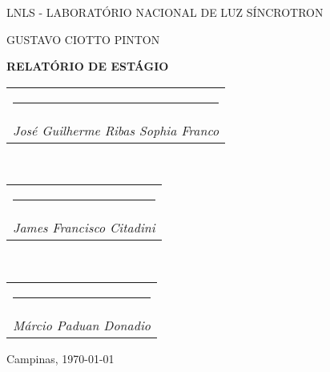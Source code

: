 \newcommand{\namesigdate}[2][8cm]{%
  \begin{tabular}{@{}p{#1}}
    \\[1\normalbaselineskip] \hrule \\[0pt]
    {\small \textit{#2}} \\[1\normalbaselineskip]
  \end{tabular}
}

\begin{center}


\vspace*{12pt}

LNLS - LABORATÓRIO NACIONAL DE LUZ SÍNCROTRON

\vspace*{.25\textheight}

{\Large GUSTAVO CIOTTO PINTON}

\vspace*{72pt}
\textbf{\Large RELATÓRIO DE ESTÁGIO} \\ \vspace{12pt}

\begin{flushright}


\vspace{12pt}

\namesigdate{José Guilherme Ribas Sophia Franco} \\
\namesigdate{James Francisco Citadini} \\
\namesigdate{Márcio Paduan Donadio}
\end{flushright}

\vspace{12pt}
 
Campinas, \today

\end{center}

\newpage 
